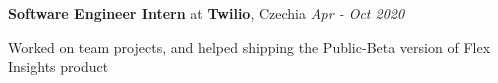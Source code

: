 {\textbf{Software Engineer Intern} at \textbf{Twilio}, Czechia} 
        \hfill {\textit{Apr - Oct 2020}}
        
    Worked on team projects, and helped shipping the Public-Beta version of Flex Insights product